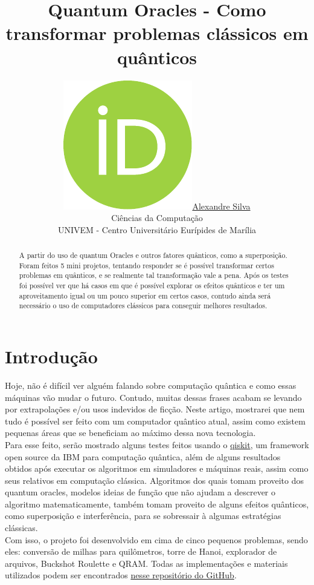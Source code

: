 \documentclass{article}
\title{Quantum Oracles - Como transformar problemas clássicos em quânticos}
\date{}
\author{ \href{https://orcid.org/0009-0008-9134-5974}{\includegraphics[scale=0.06]{orcid.pdf}\hspace{1mm}Alexandre Silva}\\
	Ciências da Computação\\
	UNIVEM - Centro Universitário Eurípides de Marília\\
}
\begin{document}
\maketitle
\begin{abstract}
	A partir do uso de quantum Oracles e outros fatores quânticos, como a superposição. Foram feitos 5 mini projetos, tentando responder se é possível transformar certos problemas em quânticos, e se realmente tal transformação vale a pena. Após os testes foi possível ver que há casos em que é possível explorar os efeitos quânticos e ter um aproveitamento igual ou um pouco superior em certos casos, contudo ainda será necessário o uso de computadores clássicos para conseguir melhores resultados.
\end{abstract}


\section{Introdução}
Hoje, não é difícil ver alguém falando sobre computação quântica e como essas máquinas vão mudar o futuro. Contudo, muitas dessas frases acabam se levando por extrapolações e/ou usos indevidos de ficção. Neste artigo, mostrarei que nem tudo é possível ser feito com um computador quântico atual, assim como existem pequenas áreas que se beneficiam ao máximo dessa nova tecnologia.\\
Para esse feito, serão mostrado alguns testes feitos usando o \href{https://www.ibm.com/quantum/qiskit}{qiskit}, um framework open source da IBM para computação quântica, além de alguns resultados obtidos após executar os algoritmos em simuladores e máquinas reais, assim como seus relativos em computação clássica. Algoritmos dos quais tomam proveito dos quantum oracles, modelos ideias de função que não ajudam a descrever o algoritmo matematicamente, também tomam proveito de alguns efeitos quânticos, como superposição e interferência, para se sobressair à algumas estratégias clássicas.\\
Com isso, o projeto foi desenvolvido em cima de cinco pequenos problemas, sendo eles: conversão de milhas para quilômetros, torre de Hanoi, explorador de arquivos, Buckshot Roulette e QRAM. Todas as implementações e materiais utilizados podem ser encontrados \href{https://github.com/Dpbm/scientific-initiation-1-quantum-oracles}{nesse repositório do GitHub}.
\end{document}
